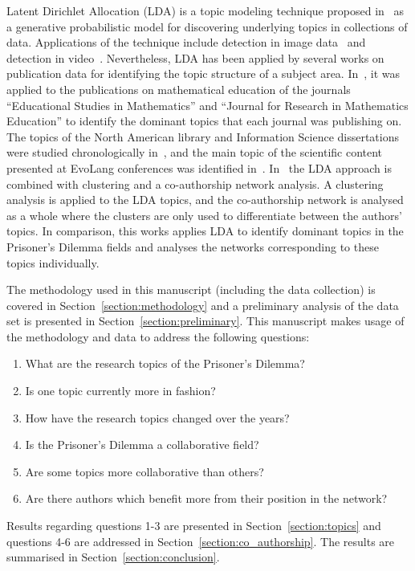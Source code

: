 \documentclass{article}
\theoremstyle{definition}
\begin{document}
Latent Dirichlet Allocation (LDA) is a topic modeling technique proposed
in~\cite{Blei2003} as a generative probabilistic model for discovering
underlying topics in collections of data.
Applications of the technique include detection in image data~\cite{
Coelho2010} and detection in video~\cite{Wang2008}. Nevertheless,
LDA has been applied by several works on publication data for identifying the
topic structure of a subject area. In~\cite{Inglis2018}, it was applied to the
publications on mathematical education of the journals ``Educational Studies in
Mathematics'' and ``Journal for Research in Mathematics Education'' to
identify the dominant topics that each journal was publishing on. The topics of
the North American library and Information Science dissertations were 
studied chronologically in~\cite{Sugimoto2011}, and the main topic of the
scientific content presented at EvoLang conferences was identified
in~\cite{Bergmann2018}. In~\cite{Bergmann2018} the LDA approach is combined with
clustering and a co-authorship network analysis. A clustering analysis is
applied to the LDA topics, and the co-authorship network is analysed as a whole
where the clusters are only used to differentiate between the authors' topics.
In comparison, this works applies
LDA to identify dominant topics in the Prisoner's Dilemma fields and analyses
the networks corresponding to these topics individually.

The methodology used in this manuscript (including the data collection) is
covered in Section~\ref{section:methodology} and a preliminary analysis of the
data set is presented in Section~\ref{section:preliminary}. This manuscript
makes usage of the methodology and data to address the following questions:

\begin{enumerate}
    \item What are the research topics of the Prisoner's Dilemma?
    \item Is one topic currently more in fashion?
    \item How have the research topics changed over the years?
    \item Is the Prisoner's Dilemma a collaborative field?
    \item Are some topics more collaborative than others?
    \item Are there authors which benefit more from their position in the
    network?
\end{enumerate}

Results regarding questions 1-3 are presented in Section~\ref{section:topics}
and questions 4-6 are addressed in Section~\ref{section:co_authorship}. The
results are summarised in Section~\ref{section:conclusion}.
\end{document}

